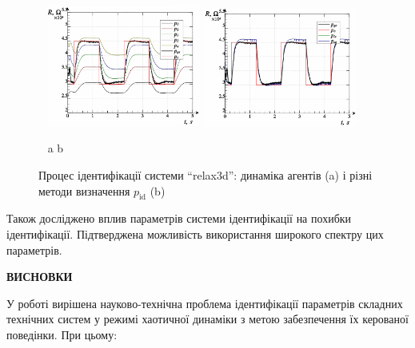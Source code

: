\documentclass[a4paper,13pt]{atuaref}
\newcommand{\xsect}[1]{\vspace{0.15ex}\begin{center}\textbf{#1}\end{center}\vspace{4pt}\penalty10000}
\begin{document}
\begin{figure}[htb!]
  \centerline{
    ~ \hfill
    \includegraphics[width=0.45\textwidth]{p7/p/relax3d_read_id2-p_p_00_xl.png}
    \hfill
    \includegraphics[width=0.45\textwidth]{p7/p/relax3d_read_id2-p_pp_00_xl.png}
    \hfill ~
  }
  \vspace{-1.7ex}
  \begin{center}
    ~ \hfill a \hfill\hfill b \hfill ~
  \end{center}
  \vspace{-2.7ex}
  \caption{Процес ідентифікації системи ``relax3d'':
  динаміка агентів (a) і різні методи визначення $p_\mathrm{id}$ (b)}
  \label{atu:f:relax3d_id_1}
\end{figure}

Також досліджено вплив параметрів системи ідентифікації на похибки ідентифікації.
Підтверджена можливість використання широкого спектру цих параметрів.



\xsect{ВИСНОВКИ}

У роботі вирішена науково-технічна проблема ідентифікації параметрів складних технічних
систем у режимі хаотичної динаміки
з метою забезпечення їх керованої поведінки. При цьому:
\end{document}
